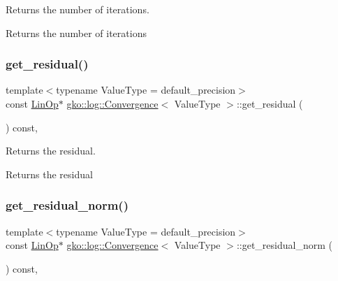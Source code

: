 Returns the number of iterations. 

\begin{DoxyReturn}{Returns}
the number of iterations 
\end{DoxyReturn}
\mbox{\label{classgko_1_1log_1_1Convergence_a6595e7edae4cb080943493252b6d77e9}} 
\subsubsection{\texorpdfstring{get\+\_\+residual()}{get\_residual()}}
{\footnotesize\ttfamily template$<$typename Value\+Type  = default\+\_\+precision$>$ \\
const \hyperlink{classgko_1_1LinOp}{Lin\+Op}$\ast$ \hyperlink{classgko_1_1log_1_1Convergence}{gko\+::log\+::\+Convergence}$<$ Value\+Type $>$\+::get\+\_\+residual (\begin{DoxyParamCaption}{ }\end{DoxyParamCaption}) const\hspace{0.3cm}{\ttfamily [inline]}, {\ttfamily [noexcept]}}



Returns the residual. 

\begin{DoxyReturn}{Returns}
the residual 
\end{DoxyReturn}
\mbox{\label{classgko_1_1log_1_1Convergence_a68297edb94aee77f6125c4b823f4503c}} 
\subsubsection{\texorpdfstring{get\+\_\+residual\+\_\+norm()}{get\_residual\_norm()}}
{\footnotesize\ttfamily template$<$typename Value\+Type  = default\+\_\+precision$>$ \\
const \hyperlink{classgko_1_1LinOp}{Lin\+Op}$\ast$ \hyperlink{classgko_1_1log_1_1Convergence}{gko\+::log\+::\+Convergence}$<$ Value\+Type $>$\+::get\+\_\+residual\+\_\+norm (\begin{DoxyParamCaption}{ }\end{DoxyParamCaption}) const\hspace{0.3cm}{\ttfamily [inline]}, {\ttfamily [noexcept]}}



